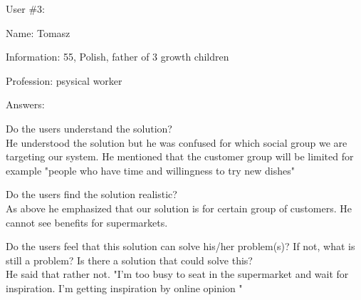 \documentclass[a4paper,10pt,oneside]{scrreprt}
\begin{document}
User \#3:
\begin{compactitem}
	\item Name: Tomasz
	\item Information: 55, Polish, father of 3 growth children
	\item Profession: psysical worker
\end{compactitem}
\bigskip

Answers:
\begin{compactitem}
	\item Do the users understand the solution?\\
	He understood the solution but he was confused for which social group we are targeting our system. He mentioned that the customer group will be limited for example "people who have time and willingness to try new dishes"\\

	\item Do the users find the solution realistic?\\
	As above he emphasized that our solution is for certain group of customers. He cannot see benefits for supermarkets.\\

	\item Do the users feel that this solution can solve his/her problem(s)? If not, what is still
	a problem? Is there a solution that could solve this?\\
	 He said that rather not. "I'm too busy to seat in the supermarket and wait for inspiration. I'm getting inspiration by online opinion "\\
\end{compactitem}

\clearpage


				
\end{document}
